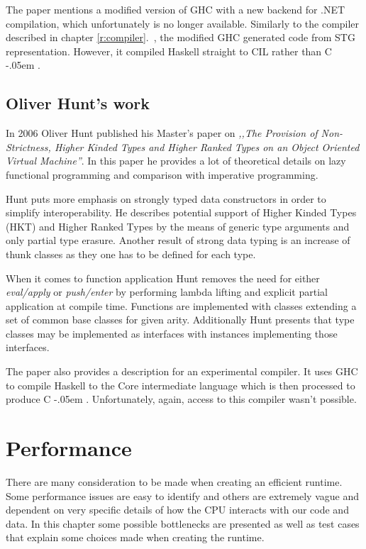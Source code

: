 \documentclass[en]{pracamgr}
\newcommand{\shrp}{%
  {\settoheight{\dimen0}{C}\kern-.05em \resizebox{!}{\dimen0}{\raisebox{\depth}{\textbf{\#}}}\hspace{1ex}}}
\newcommand{\myref}[1]{\ref{#1}.~\nameref{#1}}
\begin{document}
The paper mentions a modified version of GHC
with a new backend for .NET compilation, which
unfortunately is no longer available.
Similarly to the compiler described in chapter \myref{r:compiler},
the modified GHC generated code from STG representation.
However, it compiled Haskell straight to CIL rather than C\shrp.

\section{Oliver Hunt's work}

In 2006 Oliver Hunt published his Master's paper
on \textit{,,The Provision of Non-Strictness, Higher Kinded Types
and Higher Ranked Types on an Object Oriented
Virtual Machine''}.
In this paper he provides a lot of theoretical details
on lazy functional programming and comparison with imperative programming.

Hunt puts more emphasis on strongly typed data constructors
in order to simplify interoperability.
He describes potential support of Higher Kinded Types (HKT)
and Higher Ranked Types by the means of generic type arguments
and only partial type erasure.
Another result of strong data typing is an increase of
thunk classes as they one has to be defined for each type.

When it comes to function application Hunt removes the need
for either \textit{eval/apply} or \textit{push/enter} by
performing lambda lifting and explicit partial application
at compile time. Functions are implemented with classes
extending a set of common base classes for given arity.
Additionally Hunt presents that type classes
may be implemented as interfaces with instances implementing those interfaces.

The paper also provides a description for an experimental
compiler. It uses GHC to compile Haskell to the Core
intermediate language which is then processed to produce C\shrp.
Unfortunately, again, access to this compiler wasn't possible.


\chapter{Performance}\label{r:perf}

There are many consideration to be made when creating
an efficient runtime. Some performance issues are easy
to identify and others are extremely vague and dependent
on very specific details of how the CPU interacts with
our code and data.
In this chapter some possible bottlenecks are presented
as well as test cases that explain some choices made
when creating the runtime.
\end{document}
